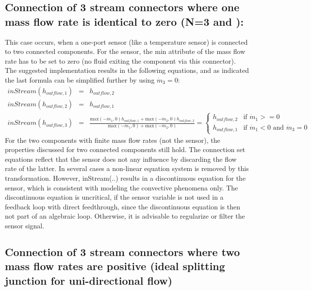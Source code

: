 \documentclass[10pt,a4paper]{report}
\def\doublelabel#1{\label{#1}}
\begin{document}
\subsection{Connection of 3 stream connectors where one mass flow rate is identical to zero (N=3 and ):}\doublelabel{connection-of-3-stream-connectors-where-one-mass-flow-rate-is-identical-to-zero-n-3-and}
This case occurs, when a one-port sensor (like a temperature sensor) is
connected to two connected components. For the sensor, the min attribute
of the mass flow rate has to be set to zero (no fluid exiting the
component via this connector). The suggested implementation results in
the following equations, and as indicated the last formula can be
simplified further by using $\dot{m}_3=0$:
\begin{eqnarray*}
inStream(h_{outflow,1})&=&h_{outflow,2}\\
inStream(h_{outflow,2})&=&h_{outflow,1}\\
inStream(h_{outflow,3})&=&\frac{\text{max}(-\dot{m}_1,0)h_{outflow,1}+\text{max}(-\dot{m}_2,0)h_{outflow,2}}{\text{max}(-\dot{m}_1,0)+\text{max}(-\dot{m}_2,0)}
=\begin{cases}
h_{outflow,2}&\text{if $\dot{m}_1>=0$}\\
h_{outflow,1}&\text{if $\dot{m}_1<0$ and $\dot{m}_3=0$}
\end{cases}
\end{eqnarray*}
For the two components with finite mass flow rates (not the sensor), the
properties discussed for two connected components still hold. The
connection set equations reflect that the sensor does not any influence
by discarding the flow rate of the latter. In several cases a non-linear
equation system is removed by this transformation. However, inStream(..)
results in a discontinuous equation for the sensor, which is consistent
with modeling the convective phenomena only. The discontinuous equation
is uncritical, if the sensor variable is not used in a feedback loop
with direct feedthrough, since the discontinuous equation is then not
part of an algebraic loop. Otherwise, it is advisable to regularize or
filter the sensor signal.

\subsection{Connection of 3 stream connectors where two mass flow rates are positive (ideal splitting junction for uni-directional flow)}\doublelabel{connection-of-3-stream-connectors-where-two-mass-flow-rates-are-positive-ideal-splitting-junction-for-uni-directional-flow}
\end{document}
